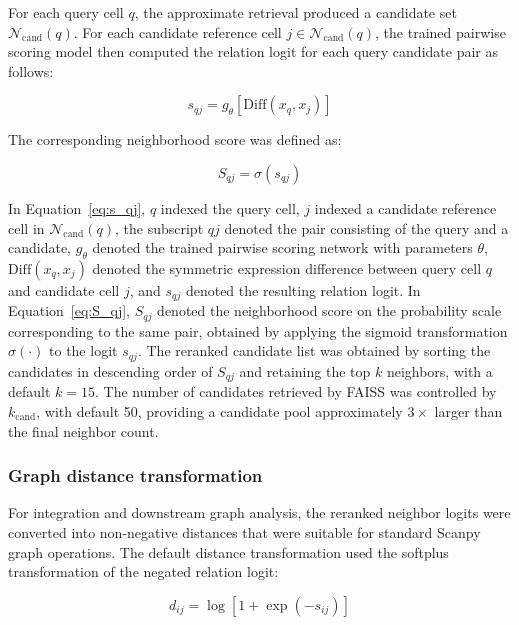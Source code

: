 \documentclass[11pt]{article}
\begin{document}
For each query cell \(q\), the approximate retrieval produced a candidate set \(\mathcal{N}_{\mathrm{cand}}(q)\). For each candidate reference cell \(j\in\mathcal{N}_{\mathrm{cand}}(q)\), the trained pairwise scoring model then computed the relation logit for each query candidate pair as follows:

\begin{equation}
s_{qj}=
g_{\theta}
\left[
\mathrm{Diff}
\left(
x_q,x_j
\right)
\right]
  \label{eq:s_qj}
\end{equation}


The corresponding neighborhood score was defined as:

\begin{equation}
S_{qj}=\sigma(s_{qj})
  \label{eq:S_qj}
\end{equation}

In Equation~\ref{eq:s_qj}, \(q\) indexed the query cell, \(j\) indexed a candidate reference cell in \(\mathcal{N}_{\mathrm{cand}}(q)\), the subscript \(qj\) denoted the pair consisting of the query and a candidate, \(g_{\theta}\) denoted the trained pairwise scoring network with parameters \(\theta\), \(\mathrm{Diff}(x_q,x_j)\) denoted the symmetric expression difference between query cell \(q\) and candidate cell \(j\), and \(s_{qj}\) denoted the resulting relation logit. In Equation~\ref{eq:S_qj}, \(S_{qj}\) denoted the neighborhood score on the probability scale corresponding to the same pair, obtained by applying the sigmoid transformation \(\sigma(\cdot)\) to the logit \(s_{qj}\). The reranked candidate list was obtained by sorting the candidates in descending order of \(S_{qj}\) and retaining the top \(k\) neighbors, with a default \(k=15\). The number of candidates retrieved by FAISS was controlled by $k_{\mathrm{cand}}$, with default 50, providing a candidate pool approximately $3\times$ larger than the final neighbor count.

\subsubsection*{Graph distance transformation}

For integration and downstream graph analysis, the reranked neighbor logits were converted into non-negative distances that were suitable for standard Scanpy graph operations. The default distance transformation used the softplus transformation of the negated relation logit:

\begin{equation}
d_{ij}=
\log
\left[
1+\exp(-s_{ij})
\right]
\end{equation}
\end{document}
